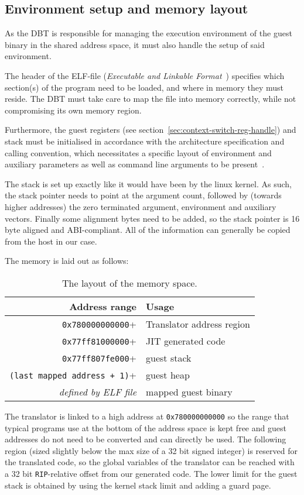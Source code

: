 \subsection{Environment setup and memory layout}
\label{sec:memory-layout}
As the DBT is responsible for managing the execution environment of the guest binary in the shared address space, it must also handle the setup of said environment.

The header of the ELF-file (\textit{Executable and Linkable Format}~\cite{elf}) specifies which section(s) of the program need to be loaded, and where in memory they must reside.
The DBT must take care to map the file into memory correctly, while not compromising its own memory region.

Furthermore, the guest registers (see section~\ref{sec:context-switch-reg-handle}) and stack must be initialised in accordance with the architecture specification and calling convention, which necessitates a specific layout of environment and auxiliary parameters as well as command line arguments to be present~\cite[S. 2]{bintrans}.

The stack is set up exactly like it would have been by the linux kernel.
As such, the stack pointer needs to point at the argument count, followed by (towards higher addresses) the zero terminated argument, environment and auxiliary vectors.
Finally some alignment bytes need to be added, so the stack pointer is 16 byte aligned and ABI-compliant.
All of the information can generally be copied from the host in our case.

The memory is laid out as follows:
\begin{table}[h]
	\centering
	\begin{tabular}{rl}
		\toprule
		\textbf{Address range} & \textbf{Usage}\\
		\midrule
		\texttt{0x780000000000}+ & Translator address region\\
		\texttt{0x77ff81000000}+ & JIT generated code\\
		\texttt{0x77ff807fe000}+ & guest stack\\
		\texttt{(last mapped address + 1)}+ & guest heap\\
		\textit{defined by ELF file} & mapped guest binary\\
		\bottomrule
	\end{tabular}
	\caption[Memory layout]%
	{The layout of the memory space.}
	\label{tab:memory-layout}
\end{table}
The translator is linked to a high address at \texttt{0x780000000000} so the range that typical programs use at the bottom of the address space is kept free and guest addresses do not need to be converted and can directly be used.
The following region (sized slightly below the max size of a 32 bit signed integer) is reserved for the translated code, so the global variables of the translator can be reached with a 32 bit \texttt{RIP}-relative offset from our generated code.
The lower limit for the guest stack is obtained by using the kernel stack limit and adding a guard page.


